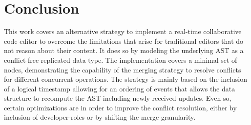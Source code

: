 \section{Conclusion}\label{sec:conclusion}

This work covers an alternative strategy to implement a real-time collaborative code editor to overcome the limitations
that arise for traditional editors that do not reason about their content.
It does so by modeling the underlying AST as a conflict-free replicated data type.
The implementation covers a minimal set of nodes, demonstrating the capability of the merging strategy to resolve
conflicts for different concurrent operations.
The strategy is mainly based on the inclusion of a logical timestamp allowing for an ordering of events that allows the
data structure to recompute the AST including newly received updates.
Even so, certain optimizations are in order to improve the conflict resolution, either by inclusion of developer-roles
or by shifting the merge granularity.